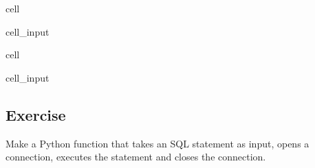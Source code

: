\documentclass[letterpaper,10pt,english]{jupyterBook}
\begin{document}
\begin{sphinxuseclass}{cell}\begin{sphinxVerbatimInput}

\begin{sphinxuseclass}{cell_input}
\begin{sphinxVerbatim}[commandchars=\\\{\}]
  
\end{sphinxVerbatim}

\end{sphinxuseclass}\end{sphinxVerbatimInput}

\end{sphinxuseclass}
\begin{sphinxuseclass}{cell}\begin{sphinxVerbatimInput}

\begin{sphinxuseclass}{cell_input}
\begin{sphinxVerbatim}[commandchars=\\\{\}]
\end{sphinxVerbatim}

\end{sphinxuseclass}\end{sphinxVerbatimInput}

\end{sphinxuseclass}

\subsection{Exercise}
\label{\detokenize{2_Data_sources/Databases/MySQL:exercise}}
\sphinxAtStartPar
Make a Python function that takes an SQL statement as input, opens a connection, executes the statement and closes the connection.

\sphinxstepscope
\end{document}
